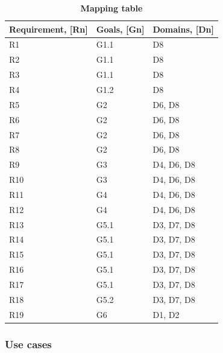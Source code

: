\newpage
\begin{table}[!htb]
\centering
\begin{tabular}{|
>{\columncolor[HTML]{EFEFEF}}l |l|l|}
\hline
\cellcolor[HTML]{C0C0C0}\textbf{Requirement, {[}Rn{]}} & \cellcolor[HTML]{C0C0C0}\textbf{Goals, {[}Gn{]}} & \cellcolor[HTML]{C0C0C0}\textbf{Domains, {[}Dn{]}} \\ \hline
R1  & G1.1 & D8         \\ \hline
R2  & G1.1 & D8         \\ \hline
R3  & G1.1 & D8         \\ \hline
R4  & G1.2 & D8         \\ \hline
R5  & G2   & D6, D8     \\ \hline
R6  & G2   & D6, D8     \\ \hline
R7  & G2   & D6, D8     \\ \hline
R8  & G2   & D6, D8     \\ \hline
R9  & G3   & D4, D6, D8 \\ \hline
R10 & G3   & D4, D6, D8 \\ \hline
R11 & G4   & D4, D6, D8 \\ \hline
R12 & G4   & D4, D6, D8 \\ \hline
R13 & G5.1 & D3, D7, D8 \\ \hline
R14 & G5.1 & D3, D7, D8 \\ \hline
R15 & G5.1 & D3, D7, D8 \\ \hline
R16 & G5.1 & D3, D7, D8 \\ \hline
R17 & G5.1 & D3, D7, D8 \\ \hline
R18 & G5.2 & D3, D7, D8 \\ \hline
R19 & G6   & D1, D2     \\ \hline
\end{tabular}
\caption{\textbf{Mapping table}}
\label{tab:my-table}
\end{table}
\newpage

\subsubsection{Use cases}


